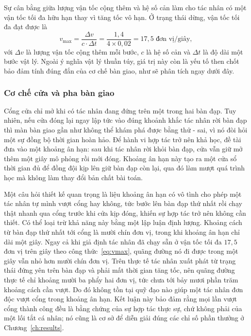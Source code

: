 \indent Sự cân bằng giữa lượng vận tốc cộng thêm và hệ số cản làm cho tác nhân có một
vận tốc tối đa hữu hạn thay vì tăng tốc vô hạn. Ở trạng thái dừng, vận tốc tối đa đạt
được là
\begin{equation}
v_{\max} = \frac{\Delta v}{c \cdot \Delta t}
         = \frac{1{,}4}{4 \times 0{,}02} = 17{,}5 \text{ đơn vị/giây},
\label{eq:vmax}
\end{equation}
với $\Delta v$ là lượng vận tốc cộng thêm mỗi bước, $c$ là hệ số cản và $\Delta t$ là
độ dài một bước vật lý. Ngoài ý nghĩa vật lý thuần túy, giá trị này còn là yếu tố then
chốt bảo đảm tính đúng đắn của cơ chế bàn giao, như sẽ phân tích ngay dưới đây.

\subsubsection{Cơ chế cửa và pha bàn giao}
\label{sub:coop-handoff}
\indent Cổng cửa chỉ mở khi có tác nhân đang đứng trên một trong hai bàn đạp. Tuy nhiên,
nếu cửa đóng lại ngay lập tức vào đúng khoảnh khắc tác nhân rời bàn đạp thì màn bàn
giao gần như không thể khám phá được bằng thử - sai, vì nó đòi hỏi một sự đồng bộ thời
gian hoàn hảo. Để hành vi hợp tác trở nên khả học, đề tài đưa vào một khoảng ân hạn:
sau khi tác nhân rời khỏi bàn đạp, cửa vẫn giữ mở thêm một giây mô phỏng rồi mới đóng.
Khoảng ân hạn này tạo ra một cửa sổ thời gian đủ để đồng đội kịp lên giữ bàn đạp còn
lại, qua đó làm mượt quá trình học mà không làm thay đổi bản chất bài toán.

\indent Một câu hỏi thiết kế quan trọng là liệu khoảng ân hạn có vô tình cho phép một
tác nhân tự mình vượt cổng hay không, tức bước lên bàn đạp thứ nhất rồi chạy
thật nhanh qua cổng trước khi cửa kịp đóng, khiến sự hợp tác trở nên không cần thiết.
Có thể loại trừ khả năng này bằng một lập luận định lượng. Khoảng cách từ bàn đạp thứ
nhất tới cổng là mười chín đơn vị, trong khi khoảng ân hạn chỉ dài một giây. Ngay cả
khi giả định tác nhân đã chạy sẵn ở vận tốc tối đa $17{,}5$ đơn vị trên giây theo công
thức~\eqref{eq:vmax}, quãng đường nó đi được trong một giây vẫn nhỏ hơn mười chín đơn
vị. Trên thực tế tác nhân xuất phát từ trạng thái đứng yên trên bàn đạp và phải mất
thời gian tăng tốc, nên quãng đường thực tế chỉ khoảng mười ba phẩy hai đơn vị, tức
chưa tới bảy mươi phần trăm khoảng cách cần vượt. Do đó không tồn tại quỹ đạo nào giúp
một tác nhân đơn độc vượt cổng trong khoảng ân hạn. Kết luận này bảo đảm rằng mọi lần
vượt cổng thành công đều là bằng chứng của sự hợp tác thực sự, chứ không phải của một
lối tắt cá nhân; nó cũng là cơ sở để diễn giải đúng các chỉ số phần thưởng ở
Chương~\ref{ch:results}.


